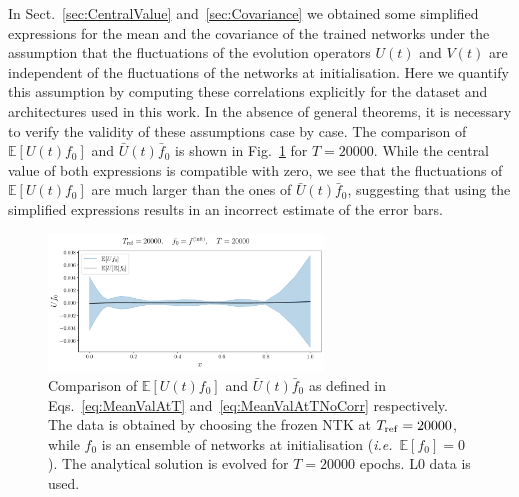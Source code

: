 


In Sect.~\ref{sec:CentralValue} and~\ref{sec:Covariance} we obtained some simplified expressions 
for the mean and the covariance of the trained networks under the assumption that the fluctuations
of the evolution operators $U(t)$ and $V(t)$ are independent of the fluctuations of the networks 
at initialisation. Here we quantify this assumption by computing these correlations explicitly 
for the dataset and architectures used in this work. In the absence of general theorems, it is necessary 
to verify the validity of these assumptions case by case. The comparison of 
$\mathbb{E}\left[U(t) f_{0}\right]$ and $\bar{U}(t) \bar{f}_{0}$ is shown in Fig.~\ref{fig:xT3_exp_val} for
$T=20000$. 
While the central value of both expressions is compatible with zero, we see that the fluctuations of 
$\mathbb{E}\left[U(t) f_{0}\right]$ are much larger than the ones of $\bar{U}(t) \bar{f}_{0}$, suggesting 
that using the simplified expressions results in an incorrect estimate of the error bars. 

\begin{figure}[t!]
  \centering
  \includegraphics[width=0.65\textwidth]{plots/u_v_studies/u_f0_independence_20000_L0.pdf}
  \caption{Comparison of $\mathbb{E}\left[U(t) f_{0}\right]$ and $\bar{U}(t) \bar{f}_{0}$ as defined in 
    Eqs.~\eqref{eq:MeanValAtT} and~\eqref{eq:MeanValAtTNoCorr} respectively. 
    The data is obtained by choosing the frozen NTK at $T_{\rm
    ref} = 20000$, while $f_0$ is an ensemble of networks at initialisation
    (\textit{i.e.}\ $\mathbb{E}[f_0]=0$). The analytical solution is evolved for
    $T=20000$ epochs. L0 data is used.}
    \label{fig:xT3_exp_val}
  \end{figure}
